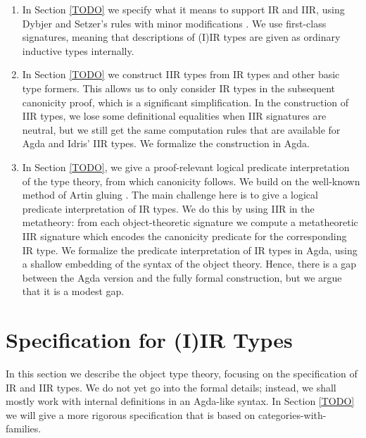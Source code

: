 \documentclass[acmsmall,screen,review,anonymous]{acmart}
\begin{document}
\begin{enumerate}
\item In Section \ref{TODO} we specify what it means to support IR and IIR, using Dybjer and
  Setzer's rules with minor modifications \cite{TODO}. We use first-class signatures,
  meaning that descriptions of (I)IR types are given as ordinary inductive types internally.
\item In Section \ref{TODO} we construct IIR types from IR types and other basic type formers. This
  allows us to only consider IR types in the subsequent canonicity proof, which is a significant
  simplification. In the construction of IIR types, we lose some definitional equalities when IIR
  signatures are neutral, but we still get the same computation rules that are available for Agda and
  Idris' IIR types. We formalize the construction in Agda.
\item In Section \ref{TODO}, we give a proof-relevant logical predicate interpretation of the type
  theory, from which canonicity follows. We build on the well-known method of Artin gluing
  \cite{TODO}. The main challenge here is to give a logical predicate interpretation of IR types. We
  do this by using IIR in the metatheory: from each object-theoretic signature we compute a
  metatheoretic IIR signature which encodes the canonicity predicate for the corresponding IR type.
  We formalize the predicate interpretation of IR types in Agda, using a shallow embedding of the
  syntax of the object theory. Hence, there is a gap between the Agda version and the fully formal
  construction, but we argue that it is a modest gap.
\end{enumerate}

\section{Specification for (I)IR Types}\label{sec:specification}

In this section we describe the object type theory, focusing on the specification of IR and IIR
types. We do not yet go into the formal details; instead, we shall mostly work with internal
definitions in an Agda-like syntax. In Section \ref{TODO} we will give a more rigorous specification that
is based on categories-with-families.
\end{document}
